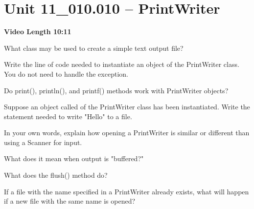 \documentclass[letterpaper,12pt]{exam}
\newcommand{\unit}{Unit 11}
\begin{document}
\section*{\unit\_010.010 -- PrintWriter} 
\par{\selectfont\textbf{Video Length 10:11}}
\begin{questions}
\begin{samepage}
    \question What class may be used to create a simple text output file?
    \vspace{5mm}
\end{samepage}

\begin{samepage}
    \question Write the line of code needed to instantiate an object of the PrintWriter class.  You do not need to handle the exception.
    \vspace{5mm}
\end{samepage}

\begin{samepage}
    \question Do print(), println(), and printf() methods work with PrintWriter objects?
    \vspace{5mm}
\end{samepage}

\begin{samepage}
    \question Suppose an object called  of the PrintWriter class has been instantiated.  Write the statement needed to write "Hello" to a file.
    \vspace{5mm}
\end{samepage}

\begin{samepage}
    \question In your own words, explain how opening a PrintWriter is similar or different than using a Scanner for input.
    \vspace{15mm}
\end{samepage}

\begin{samepage}
    \question What does it mean when output is "buffered?"
    \vspace{5mm}
\end{samepage}

\begin{samepage}
    \question What does the flush() method do?
    \vspace{5mm}
\end{samepage}

\begin{samepage}
    \question If a file with the name specified in a PrintWriter already exists, what will happen if a new file with the same name is opened?
    \vspace{5mm}
\end{samepage}


\end{questions}
\end{document}
